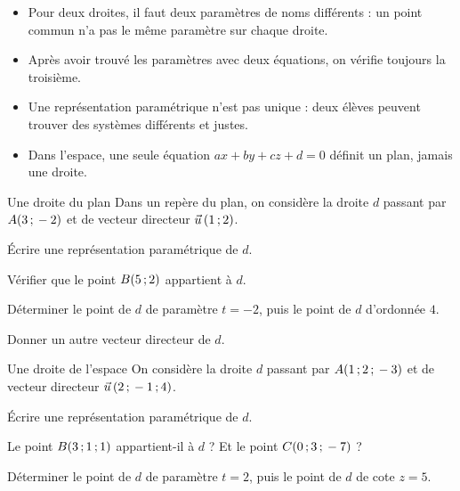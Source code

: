 \begin{attention}
\begin{itemize}[label={\color{otOrange}\textbullet},leftmargin=1.4em,itemsep=0.6mm,topsep=0.5mm]
  \item Pour deux droites, il faut deux paramètres de noms différents : un point commun n'a pas le même paramètre sur chaque droite.
  \item Après avoir trouvé les paramètres avec deux équations, on vérifie toujours la troisième.
  \item Une représentation paramétrique n'est pas unique : deux élèves peuvent trouver des systèmes différents et justes.
  \item Dans l'espace, une seule équation $ax+by+cz+d=0$ définit un plan, jamais une droite.
\end{itemize}
\end{attention}

\exercices
{}

\begin{exercice}[1]{Une droite du plan}
Dans un repère du plan, on considère la droite $d$ passant par $A(3\,{;}\,-2)$ et de vecteur directeur $\vec u\,(1\,{;}\,2)$.
\begin{questions}
  \item Écrire une représentation paramétrique de $d$.
  \item Vérifier que le point $B(5\,{;}\,2)$ appartient à $d$.
  \item Déterminer le point de $d$ de paramètre $t=-2$, puis le point de $d$ d'ordonnée $4$.
  \item Donner un autre vecteur directeur de $d$.
\end{questions}
\end{exercice}

\begin{exercice}[1]{Une droite de l'espace}
On considère la droite $d$ passant par $A(1\,{;}\,2\,{;}\,-3)$ et de vecteur directeur $\vec u\,(2\,{;}\,-1\,{;}\,4)$.
\begin{questions}
  \item Écrire une représentation paramétrique de $d$.
  \item Le point $B(3\,{;}\,1\,{;}\,1)$ appartient-il à $d$ ? Et le point $C(0\,{;}\,3\,{;}\,-7)$ ?
  \item Déterminer le point de $d$ de paramètre $t=2$, puis le point de $d$ de cote $z=5$.
\end{questions}
\end{exercice}

